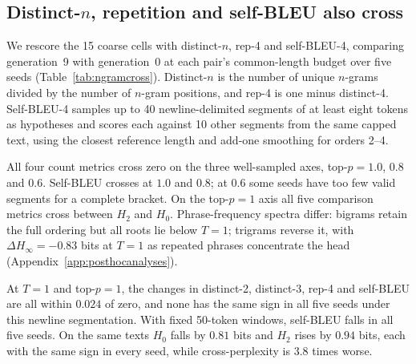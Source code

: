 \documentclass[10pt]{article}
\theoremstyle{plain}
\theoremstyle{definition}
\newcommand{\Htwo}{H_2}
\newcommand{\Hz}{H_0}
\begin{document}
\subsection{Distinct-\texorpdfstring{$n$}{n}, repetition and self-BLEU also cross}
\label{sec:notrenyi}

We rescore the 15 coarse cells with distinct-$n$, rep-4 and self-BLEU-4, comparing generation~9
with generation~0 at each pair's common-length budget over five seeds
(Table~\ref{tab:ngramcross}). Distinct-$n$ is the number of unique $n$-grams divided by the
number of $n$-gram positions, and rep-4 is one minus distinct-4. Self-BLEU-4 samples up to 40
newline-delimited segments of at least eight tokens as hypotheses and scores each against 10
other segments from the same capped text, using the closest reference length and add-one
smoothing for orders 2--4.

All four count metrics cross zero on the three well-sampled axes, top-$p=1.0$, $0.8$ and $0.6$.
Self-BLEU crosses at $1.0$ and $0.8$; at $0.6$ some seeds have too few valid segments for a
complete bracket. On the top-$p=1$ axis all five comparison metrics cross between $\Htwo$ and $\Hz$.
Phrase-frequency spectra differ: bigrams retain the full ordering but all roots lie below
$T=1$; trigrams reverse it, with $\Delta H_\infty=-0.83$ bits at $T=1$ as repeated phrases
concentrate the head (Appendix~\ref{app:posthocanalyses}).

At $T=1$ and top-$p=1$, the changes in distinct-2, distinct-3, rep-4 and self-BLEU are all
within $0.024$ of zero, and none has the same sign in all five seeds under this newline
segmentation. With fixed 50-token windows, self-BLEU falls in all five seeds. On the same texts $\Hz$
falls by $0.81$ bits and $\Htwo$ rises by $0.94$ bits, each with the same sign in every seed,
while cross-perplexity is $3.8$ times worse.
\end{document}
